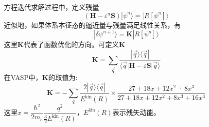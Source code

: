 方程迭代求解过程中，定义残量
	\begin{displaymath}
		(\mathbf{H}-\varepsilon^n\mathbf{S})|\psi^n\rangle=|R[\psi^n]\rangle
	\end{displaymath}
近似地，如果体系本征态的逼近量与残量满足线性关系，有
\begin{displaymath}
	|\delta\psi^{n+1}\rangle=\mathbf{K}|R[\psi^n]\rangle
\end{displaymath}
这里$\mathbf{K}$代表了函数优化的方向。可定义$\mathbf{K}$
\begin{equation}
	\mathbf{K}=\sum_{\vec q}\dfrac{|\vec q\rangle\langle\vec q|}{\langle\vec q|\mathbf{H}-\varepsilon\mathbf{S}|\vec q\rangle}
	\label{eq:Predict}
\end{equation}
在\textrm{VASP}中，$\mathbf{K}$的取值为:
\begin{displaymath}
	\mathbf{K}=-\sum_q\dfrac{2|\vec q\rangle\langle\vec q|}{E^{\mathrm{kin}}(R)}\times\dfrac{27+18x+12x^2+8x^3}{27+18x+12x^2+8x^3+16x^4}
\end{displaymath}
这里$x=\dfrac{\hbar^2}{2m_e}\dfrac{q^2}{\frac32E^{\mathrm{kin}}(R)}$，$E^{\mathrm{kin}}(R)$表示残矢动能。

